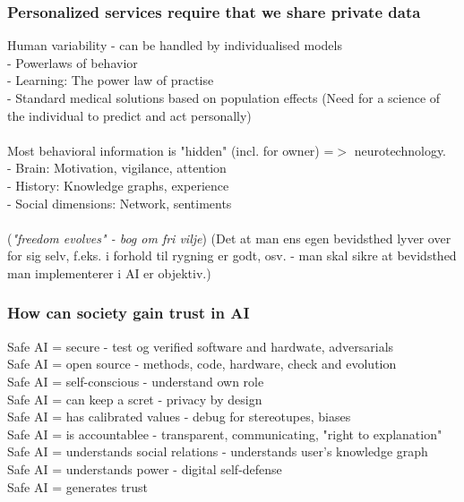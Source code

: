 \documentclass[11pt, fleqn]{article}
\begin{document}
	\subsubsection*{Personalized services require that we share private data}
	\vspace*{-0.2cm}
	Human variability - can be handled by individualised models \\
	- Powerlaws of behavior \\
	- Learning: The power law of practise \\ 
	- Standard medical solutions based on population effects (Need for a science of the individual to predict and act personally)
	\\\\
	Most behavioral information is "hidden" (incl. for owner) =$ > $ neurotechnology.\\
	- Brain: Motivation, vigilance, attention \\
	- History: Knowledge graphs, experience \\
	- Social dimensions: Network, sentiments
	\\\\
	(\textit{"freedom evolves" - bog om fri vilje})
	(Det at man ens egen bevidsthed lyver over for sig selv, f.eks. i forhold til rygning er godt, osv. - man skal sikre at bevidsthed man implementerer i AI er objektiv.)
	
	\subsubsection*{How can society gain trust in AI}
	\vspace*{-0.2cm}
	Safe AI = secure - test og verified software and hardwate, adversarials\\
	Safe AI = open source - methods, code, hardware, check and evolution \\
	Safe AI = self-conscious - understand own role \\
	Safe AI = can keep a scret - privacy by design \\
	Safe AI = has calibrated values - debug for stereotupes, biases \\
	Safe AI = is accountablee - transparent, communicating, "right to explanation" \\
	Safe AI = understands social relations - understands user's knowledge graph \\
	Safe AI = understands power - digital self-defense \\
	Safe AI = generates trust
	\\
\end{document}
